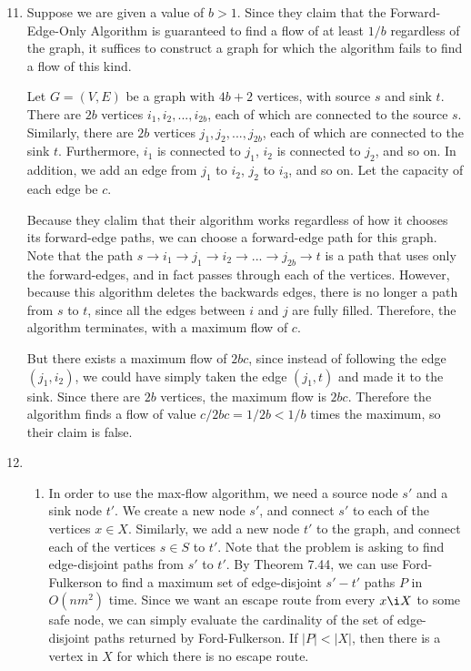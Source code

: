 \documentclass[oneside, 12pt]{article}
\begin{document}
\begin{enumerate}
\setcounter{enumi}{10}
\item	
Suppose we are given a value of $b > 1$. Since they claim that the Forward-Edge-Only Algorithm is guaranteed to find a flow of at least $1/b$ regardless of the graph, it suffices to construct a graph for which the algorithm fails to find a flow of this kind.

Let $G = (V,E)$ be a graph with $4b + 2$ vertices, with source $s$ and sink $t$. There are $2b$ vertices $i_1, i_2, ..., i_{2b}$, each of which are connected to the source $s$. Similarly, there are $2b$ vertices $j_1, j_2,...,j_{2b}$, each of which are connected to the sink $t$. Furthermore, $i_1$ is connected to $j_1$, $i_2$ is connected to $j_2$, and so on. In addition, we add an edge from $j_1$ to $i_2$, $j_2$ to $i_3$, and so on. Let the capacity of each edge be $c$. 

Because they clalim that their algorithm works regardless of how it chooses its forward-edge paths, we can choose a forward-edge path for this graph. Note that the path $s \rightarrow i_1 \rightarrow j_1 \rightarrow i_2 \rightarrow ... \rightarrow j_{2b} \rightarrow t$ is a path that uses only the forward-edges, and in fact passes through each of the vertices. However, because this algorithm deletes the backwards edges, there is no longer a path from $s$ to $t$, since all the edges between $i$ and $j$ are fully filled. Therefore, the algorithm terminates, with a maximum flow of $c$. 

But there exists a maximum flow of $2bc$, since instead of following the edge $(j_1, i_2)$, we could have simply taken the edge $(j_1, t)$ and made it to the sink. Since there are $2b$ vertices, the maximum flow is $2bc$. Therefore the algorithm finds a flow of value $c/2bc = 1/2b < 1/b$ times the maximum, so their claim is false.
\clearpage
\setcounter{enumi}{13}
\item
\begin{enumerate}
\item
In order to use the max-flow algorithm, we need a source node $s'$ and a sink node $t'$. We create a new node $s'$, and connect $s'$ to each of the vertices $x \in X$. Similarly, we add a new node $t'$ to the graph, and connect each of the vertices $s \in S$ to $t'$. Note that the problem is asking to find edge-disjoint paths from $s'$ to $t'$. By Theorem 7.44, we can use Ford-Fulkerson to find a maximum set of edge-disjoint $s'-t'$ paths $P$ in $O(nm^2)$ time. Since we want an escape route from every $x \i X$ to some safe node, we can simply evaluate the cardinality of the set of edge-disjoint paths returned by Ford-Fulkerson. If $|P| < |X|$, then there is a vertex in $X$ for which there is no escape route. 


\end{enumerate}
\end{enumerate}
\end{document}
